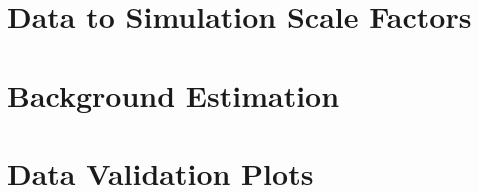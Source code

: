 \documentclass{cmspaper}
\begin{document}
\clearpage
\section{Data to Simulation Scale Factors}


\section{Background Estimation}
\label{app:lp_bkgestim}


\section{Data Validation Plots}
\label{app:lp_postEPSdist}






\clearpage


\end{document}
